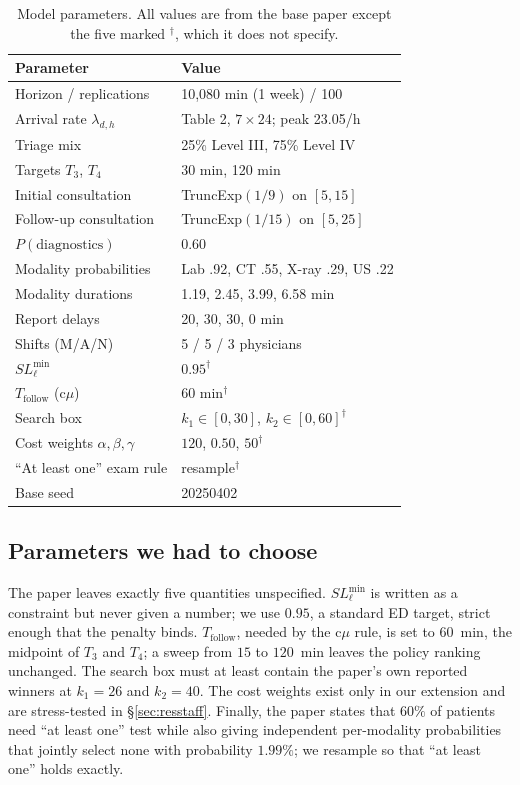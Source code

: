\documentclass[sigconf,nonacm]{acmart}
\begin{document}
\begin{table}[t]
\caption{Model parameters. All values are from the base paper except the five
         marked $^\dagger$, which it does not specify.}
\label{tab:params}
\small
\begin{tabular}{@{}p{3.6cm}p{4.0cm}@{}}
\toprule
\textbf{Parameter} & \textbf{Value} \\
\midrule
Horizon / replications      & 10{,}080 min (1 week) / 100 \\
Arrival rate $\lambda_{d,h}$& Table 2, $7\times24$; peak 23.05/h \\
Triage mix                  & 25\% Level III, 75\% Level IV \\
Targets $T_3$, $T_4$        & 30 min, 120 min \\
Initial consultation        & TruncExp$(1/9)$ on $[5,15]$ \\
Follow-up consultation      & TruncExp$(1/15)$ on $[5,25]$ \\
$P(\text{diagnostics})$     & 0.60 \\
Modality probabilities      & Lab .92, CT .55, X-ray .29, US .22 \\
Modality durations          & 1.19, 2.45, 3.99, 6.58 min \\
Report delays               & 20, 30, 30, 0 min \\
Shifts (M/A/N)              & 5 / 5 / 3 physicians \\
\midrule
$SL^{\min}_\ell$            & $0.95^\dagger$ \\
$T_{\text{follow}}$ (c$\mu$)& $60$ min$^\dagger$ \\
Search box                  & $k_1\in[0,30]$, $k_2\in[0,60]^\dagger$ \\
Cost weights $\alpha,\beta,\gamma$ & $120$, $0.50$, $50^\dagger$ \\
``At least one'' exam rule  & resample$^\dagger$ \\
\midrule
Base seed                   & 20250402 \\
\bottomrule
\end{tabular}
\end{table}

\subsection{Parameters we had to choose}
The paper leaves exactly five quantities unspecified. $SL^{\min}_\ell$ is
written as a constraint but never given a number; we use $0.95$, a standard ED
target, strict enough that the penalty binds. $T_{\text{follow}}$, needed by the
c$\mu$ rule, is set to $60$~min, the midpoint of $T_3$ and $T_4$; a sweep from
$15$ to $120$~min leaves the policy ranking unchanged. The search box must at
least contain the paper's own reported winners at $k_1=26$ and $k_2=40$. The
cost weights exist only in our extension and are stress-tested in
\S\ref{sec:resstaff}. Finally, the paper states that $60\%$ of patients need
``at least one'' test while also giving independent per-modality probabilities
that jointly select none with probability $1.99\%$; we resample so that ``at
least one'' holds exactly.
\end{document}
